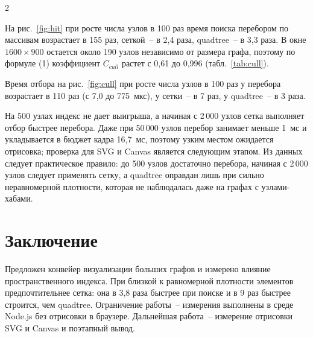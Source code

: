 \documentclass[a4paper,10pt,twoside]{article}
\begin{document}
\begin{multicols}{2}

На рис.~\ref{fig:hit} при росте числа узлов в 100 раз время поиска перебором по массивам возрастает в 155 раз, сеткой~-- в 2,4 раза, quadtree~-- в 3,3 раза. В окне $1600\times900$ остается около 190 узлов независимо от размера графа, поэтому по формуле (1) коэффициент $C_{cull}$ растет с 0,61 до 0,996 (табл.~\ref{tab:cull}).


Время отбора на рис.~\ref{fig:cull} при росте числа узлов в 100 раз у перебора возрастает в 110 раз (с 7,0 до 775~мкс), у сетки~-- в 7 раз, у quadtree~-- в 3 раза.


На 500 узлах индекс не дает выигрыша, а начиная с 2\,000 узлов сетка выполняет отбор быстрее перебора. Даже при 50\,000 узлов перебор занимает меньше 1~мс и укладывается в бюджет кадра 16,7~мс, поэтому узким местом ожидается отрисовка; проверка для SVG и Canvas является следующим этапом. Из данных следует практическое правило: до 500 узлов достаточно перебора, начиная с 2\,000 узлов следует применять сетку, а quadtree оправдан лишь при сильно неравномерной плотности, которая не наблюдалась даже на графах с узлами-хабами.

\section*{Заключение}
Предложен конвейер визуализации больших графов и измерено влияние пространственного индекса. При близкой к равномерной плотности элементов предпочтительнее сетка: она в 3,8 раза быстрее при поиске и в 9 раз быстрее строится, чем quadtree. Ограничение работы~-- измерения выполнены в среде Node.js без отрисовки в браузере. Дальнейшая работа~-- измерение отрисовки SVG и Canvas и поэтапный вывод.


\end{multicols}
\end{document}
